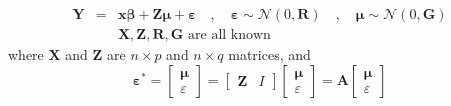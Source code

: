 \documentclass{article}
\begin{document}
\begin{eqnarray*}
\mathbf{Y} &=&\mathbf{x\beta }+\mathbf{Z\mu }+\mathbf{\varepsilon \quad
,\quad \varepsilon }\sim \mathcal{N}\left( 0,\mathbf{R}\right) \mathbf{\quad
,\quad \mu }\sim \mathcal{N}\left( 0,\mathbf{G}\right)  \\
&&\mathbf{X,Z,R,G}\text{ are all known}
\end{eqnarray*}%
where $\mathbf{X}$ and $\mathbf{Z}$ are $n\times p$ and $n\times q$
matrices, and%
\begin{equation*}
\mathbf{\varepsilon }^{\ast }=\left[ 
\begin{array}{c}
\mathbf{\mu } \\ 
\varepsilon 
\end{array}%
\right] =\left[ 
\begin{array}{cc}
\mathbf{Z} & I%
\end{array}%
\right] \left[ 
\begin{array}{c}
\mathbf{\mu } \\ 
\varepsilon 
\end{array}%
\right] =\mathbf{A}\left[ 
\begin{array}{c}
\mathbf{\mu } \\ 
\varepsilon 
\end{array}%
\right] 
\end{equation*}

\bigskip 
\end{document}
